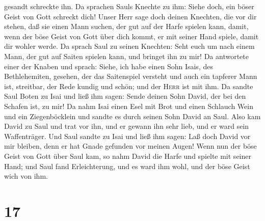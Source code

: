 gesandt schreckte ihn.  Da sprachen Sauls Knechte zu ihm:
Siehe doch, ein böser Geist von Gott schreckt dich! 
Unser Herr sage doch deinen Knechten, die vor dir stehen, daß sie einen
Mann suchen, der gut auf der Harfe spielen kann, damit, wenn der böse
Geist von Gott über dich kommt, er mit seiner Hand spiele, damit dir
wohler werde.  Da sprach Saul zu seinen Knechten: Seht
euch um nach einem Mann, der gut auf Saiten spielen kann, und bringet
ihn zu mir!  Da antwortete einer der Knaben und sprach:
Siehe, ich habe einen Sohn Isais, des Bethlehemiten, gesehen, der das
Saitenspiel versteht und auch ein tapferer Mann ist, streitbar, der Rede
kundig und schön; und der \textsc{Herr} ist mit ihm.  Da
sandte Saul Boten zu Isai und ließ ihm sagen: Sende deinen Sohn David,
der bei den Schafen ist, zu mir!  Da nahm Isai einen Esel
mit Brot und einen Schlauch Wein und ein Ziegenböcklein und sandte es
durch seinen Sohn David an Saul.  Also kam David zu Saul
und trat vor ihn, und er gewann ihn sehr lieb, und er ward sein
Waffenträger.  Und Saul sandte zu Isai und ließ ihm
sagen: Laß doch David vor mir bleiben, denn er hat Gnade gefunden vor
meinen Augen!  Wenn nun der böse Geist von Gott über Saul
kam, so nahm David die Harfe und spielte mit seiner Hand; und Saul fand
Erleichterung, und es ward ihm wohl, und der böse Geist wich von ihm.

\hypertarget{section-16}{%
\section{17}\label{section-16}}

